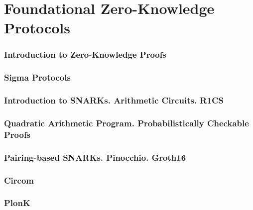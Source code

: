 \documentclass{config/zkdl-template}
\begin{document}

    \part{Foundational Zero-Knowledge Protocols}
    

    \section{Introduction to Zero-Knowledge Proofs}\label{section:intro-zk}
    

    \section{Sigma Protocols}\label{section:sigma}
    

    \section[Arithmetic Circuits. R1CS]{Introduction to SNARKs. Arithmetic Circuits. R1CS}\label{section:r1cs}
    \label{section:circuits}

    \section[Quadratic Arithmetic Program]{Quadratic Arithmetic Program. Probabilistically Checkable Proofs}\label{section:qap-pcp}
    

    \section[Pairing-based SNARKs]{Pairing-based SNARKs. Pinocchio. Groth16}\label{section:groth}
    

    \section{Circom}\label{section:circom}
    

    \section{PlonK}\label{section:plonk}
    
\end{document}
